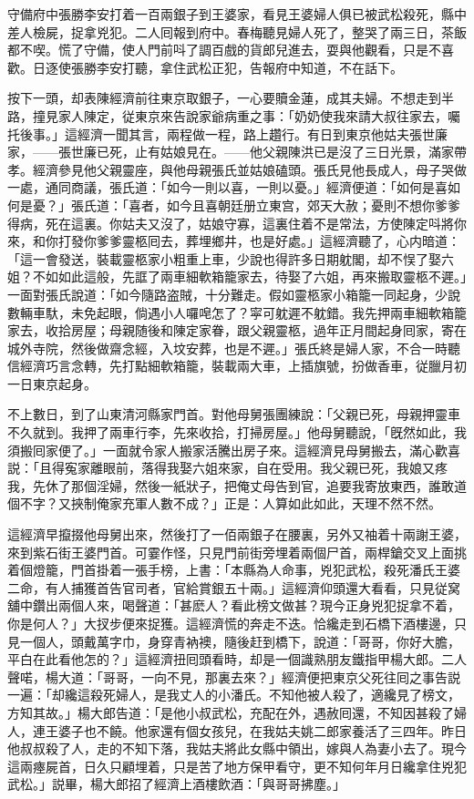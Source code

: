 守備府中張勝李安打着一百兩銀子到王婆家，看見王婆婦人俱已被武松殺死，縣中差人檢屍，捉拿兇犯。二人囘報到府中。春梅聽見婦人死了，整哭了兩三日，茶飯都不喫。慌了守備，使人門前呌了調百戲的貨郎兒進去，耍與他觀看，只是不喜歡。日逐使張勝李安打聽，拿住武松正犯，告報府中知道，不在話下。

按下一頭，却表陳經濟前往東京取銀子，一心要贖金蓮，成其夫婦。不想走到半路，撞見家人陳定，従東京來告說家爺病重之事：「奶奶使我來請大叔往家去，囑托後事。」這經濟一聞其言，兩程做一程，路上趲行。有日到東京他姑夫張世廉家，——張世廉已死，止有姑娘見在。——他父親陳洪已是沒了三日光景，滿家帶孝。經濟參見他父親靈座，與他母親張氏並姑娘磕頭。張氏見他長成人，母子哭做一處，通同商議，張氏道：「如今一則以喜，一則以憂。」經濟便道：「如何是喜如何是憂？」張氏道：「喜者，如今且喜朝廷册立東宫，郊天大赦；憂則不想你爹爹得病，死在這裏。你姑夫又沒了，姑娘守寡，這裏住着不是常法，方使陳定呌將你來，和你打發你爹爹靈柩囘去，葬埋鄉井，也是好處。」這經濟聽了，心内暗道：「這一會發送，裝載靈柩家小粗重上車，少說也得許多日期躭閣，却不悮了娶六姐？不如如此這般，先誆了兩車細軟箱籠家去，待娶了六姐，再來搬取靈柩不遲。」一面對張氏說道：「如今隨路盗賊，十分難走。假如靈柩家小箱籠一同起身，少說數輛車馱，未免起眼，倘遇小人囉唣怎了？寜可躭遲不躭錯。我先押兩車細軟箱籠家去，收拾房屋；母親随後和陳定家眷，跟父親靈柩，過年正月間起身囘家，寄在城外寺院，然後做齋念經，入坟安葬，也是不遲。」張氏終是婦人家，不合一時聽信經濟巧言念轉，先打點細軟箱籠，裝載兩大車，上插旗號，扮做香車，従臘月初一日東京起身。

不上數日，到了山東清河縣家門首。對他母舅張團練說：「父親已死，母親押靈車不久就到。我押了兩車行李，先來收拾，打掃房屋。」他母舅聽說，「旣然如此，我須搬囘家便了。」一面就令家人搬家活騰出房子來。這經濟見母舅搬去，滿心歡喜説：「且得寃家離眼前，落得我娶六姐來家，自在受用。我父親已死，我娘又疼我，先休了那個淫婦，然後一紙狀子，把俺丈母告到官，追要我寄放東西，誰敢道個不字？又挾制俺家充軍人數不成？」正是：人算如此如此，天理不然不然。

這經濟早攛掇他母舅出來，然後打了一佰兩銀子在腰裏，另外又袖着十兩謝王婆，來到紫石街王婆門首。可霎作怪，只見門前街旁埋着兩個尸首，兩桿鎗交叉上面挑着個燈籠，門首掛着一張手榜，上書：「本縣為人命事，兇犯武松，殺死潘氏王婆二命，有人捕獲首告官司者，官給賞銀五十兩。」這經濟仰頭還大看看，只見従窝舖中鑽出兩個人來，喝聲道：「甚麽人？看此榜文做甚？現今正身兇犯捉拿不着，你是何人？」大扠步便來捉獲。這經濟慌的奔走不迭。恰纔走到石橋下酒樓邊，只見一個人，頭戴萬字巾，身穿青衲襖，隨後赶到橋下，說道：「哥哥，你好大膽，平白在此看他怎的？」這經濟扭囘頭看時，却是一個識熟朋友鐵指甲楊大郎。二人聲喏，楊大道：「哥哥，一向不見，那裏去來？」經濟便把東京父死往囘之事告説一遍：「却纔這殺死婦人，是我丈人的小潘氏。不知他被人殺了，適纔見了榜文，方知其故。」楊大郎告道：「是他小叔武松，充配在外，遇赦囘還，不知因甚殺了婦人，連王婆子也不饒。他家還有個女孩兒，在我姑夫姚二郎家養活了三四年。昨日他叔叔殺了人，走的不知下落，我姑夫將此女縣中領出，嫁與人為妻小去了。現今這兩瘞屍首，日久只顧埋着，只是苦了地方保甲看守，更不知何年月日纔拿住兇犯武松。」説畢，楊大郎招了經濟上酒樓飲酒：「與哥哥拂塵。」

